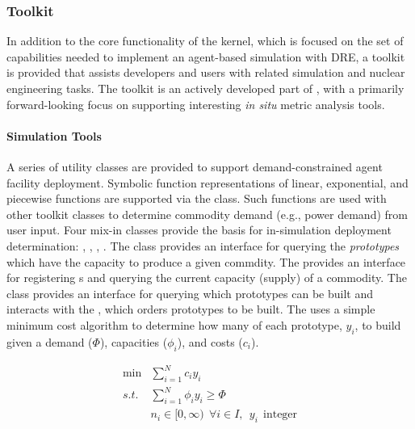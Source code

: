 \subsubsection{Toolkit}

In addition to the core functionality of the \Cyclus kernel, which is focused on
the set of capabilities needed to implement an agent-based simulation
with \gls{DRE}, a toolkit is provided that assists developers
and users with related simulation and nuclear engineering tasks. The toolkit is
an actively developed part of \Cyclus, with a primarily forward-looking
focus on supporting interesting \textit{in situ} metric analysis tools.

\paragraph{Simulation Tools}

A series of utility classes are provided to support demand-constrained agent
facility deployment. Symbolic function representations of linear,
exponential, and piecewise functions are supported via the
 class. Such functions are used with other toolkit
classes to determine commodity demand (e.g., power demand) from user input. Four
mix-in classes provide the basis for in-simulation deployment determination:
, , ,
. The  class provides an
interface for querying the \textit{prototypes} which have the
capacity to produce a given commdity. The 
provides an interface for registering s and querying
the current capacity (supply) of a commodity. The  class provides
an interface for querying which prototypes can be built and interacts with the
, which orders prototypes to be built. The
 uses a simple minimum cost algorithm to determine how
many of each prototype, $y_i$, to build given a demand ($\Phi$), capacities
($\phi_i$), and costs ($c_i$).

\begin{equation}
\begin{aligned}
 \min & \sum_{i=1}^{N}c_i y_i \\
 s.t. & \sum_{i=1}^{N}\phi_i y_i \ge \Phi \\
      & n_i \in [0,\infty) \:\: \forall i \in I, \:\: y_i \:\: \text{integer}
\end{aligned}
\end{equation}

